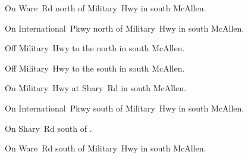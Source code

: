 
\begin{LocationList}

On Ware~Rd north of  Military~Hwy in south McAllen.

On International~Pkwy north of  Military~Hwy in south McAllen.

Off  Military~Hwy to the north in south McAllen.

\Location{\GarageHQ \Garage}
Off  Military~Hwy to the south in south McAllen.

\Location{\GasStation \Gas}
On  Military~Hwy at  Shary~Rd in south McAllen.

On International~Pkwy south of  Military~Hwy in south McAllen.

On  Shary~Rd south of .

On Ware~Rd south of  Military~Hwy in south McAllen.

\end{LocationList}
